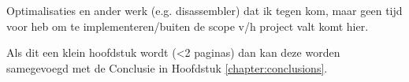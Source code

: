 Optimalisaties en ander werk (e.g. disassembler) dat ik tegen kom, maar geen tijd voor heb om te implementeren/buiten de scope v/h project valt komt hier.

Als dit een klein hoofdstuk wordt (<2 paginas) dan kan deze worden samegevoegd met de Conclusie in Hoofdstuk \ref{chapter:conclusions}. 

\blindtext

\Blindtext

